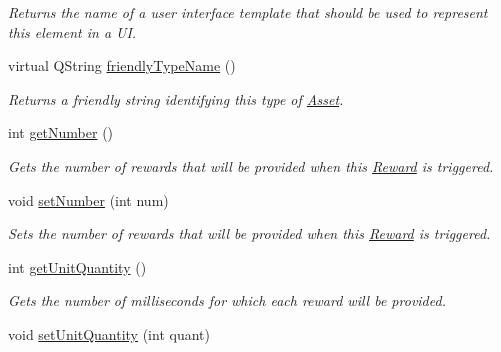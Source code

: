 \begin{DoxyCompactItemize}
\begin{DoxyCompactList}\small\item\em Returns the name of a user interface template that should be used to represent this element in a U\-I. \end{DoxyCompactList}\item 
virtual Q\-String \hyperlink{class_picto_1_1_reward_a6a96e2e9cf2ad16ed5553adb9a72ca3e}{friendly\-Type\-Name} ()
\begin{DoxyCompactList}\small\item\em Returns a friendly string identifying this type of \hyperlink{class_picto_1_1_asset}{Asset}. \end{DoxyCompactList}\item 
\hypertarget{class_picto_1_1_reward_a8c83183b80c44e95fa86d9e4e52ccfca}{int \hyperlink{class_picto_1_1_reward_a8c83183b80c44e95fa86d9e4e52ccfca}{get\-Number} ()}\label{class_picto_1_1_reward_a8c83183b80c44e95fa86d9e4e52ccfca}

\begin{DoxyCompactList}\small\item\em Gets the number of rewards that will be provided when this \hyperlink{class_picto_1_1_reward}{Reward} is triggered. \end{DoxyCompactList}\item 
\hypertarget{class_picto_1_1_reward_ae746594e8b9e8e5d7defc49afe1652c0}{void \hyperlink{class_picto_1_1_reward_ae746594e8b9e8e5d7defc49afe1652c0}{set\-Number} (int num)}\label{class_picto_1_1_reward_ae746594e8b9e8e5d7defc49afe1652c0}

\begin{DoxyCompactList}\small\item\em Sets the number of rewards that will be provided when this \hyperlink{class_picto_1_1_reward}{Reward} is triggered. \end{DoxyCompactList}\item 
\hypertarget{class_picto_1_1_reward_a97d509e37a118eeed08899738ab21a04}{int \hyperlink{class_picto_1_1_reward_a97d509e37a118eeed08899738ab21a04}{get\-Unit\-Quantity} ()}\label{class_picto_1_1_reward_a97d509e37a118eeed08899738ab21a04}

\begin{DoxyCompactList}\small\item\em Gets the number of milliseconds for which each reward will be provided. \end{DoxyCompactList}\item 
\hypertarget{class_picto_1_1_reward_adda7a1f24528a5ab1d054322ba0970f7}{void \hyperlink{class_picto_1_1_reward_adda7a1f24528a5ab1d054322ba0970f7}{set\-Unit\-Quantity} (int quant)}\label{class_picto_1_1_reward_adda7a1f24528a5ab1d054322ba0970f7}


\end{DoxyCompactItemize}
